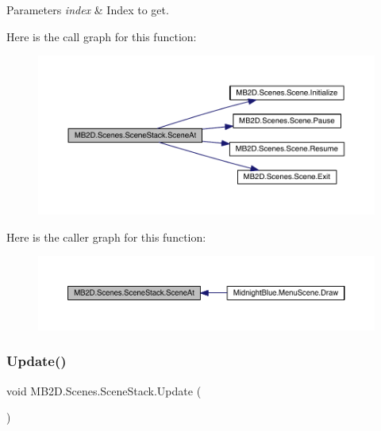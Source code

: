 \begin{DoxyParams}{Parameters}
{\em index} & Index to get.\\
\hline
\end{DoxyParams}
Here is the call graph for this function\+:
\nopagebreak
\begin{figure}[H]
\begin{center}
\leavevmode
\includegraphics[width=350pt]{class_m_b2_d_1_1_scenes_1_1_scene_stack_a84b1a5b2771f6c663eece04bcafd5416_cgraph}
\end{center}
\end{figure}
Here is the caller graph for this function\+:
\nopagebreak
\begin{figure}[H]
\begin{center}
\leavevmode
\includegraphics[width=350pt]{class_m_b2_d_1_1_scenes_1_1_scene_stack_a84b1a5b2771f6c663eece04bcafd5416_icgraph}
\end{center}
\end{figure}
\hypertarget{class_m_b2_d_1_1_scenes_1_1_scene_stack_a8486b29eb65458e88512989201772984}{}\label{class_m_b2_d_1_1_scenes_1_1_scene_stack_a8486b29eb65458e88512989201772984} 
\subsubsection{\texorpdfstring{Update()}{Update()}}
{\footnotesize\ttfamily void M\+B2\+D.\+Scenes.\+Scene\+Stack.\+Update (\begin{DoxyParamCaption}{ }\end{DoxyParamCaption})\hspace{0.3cm}{\ttfamily [inline]}}



